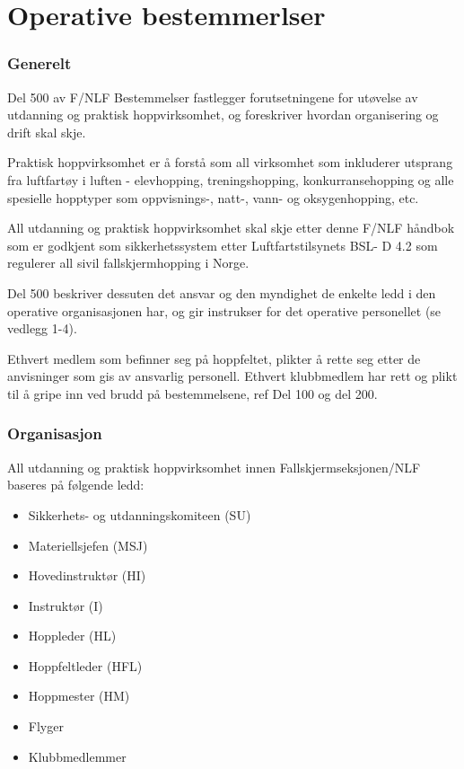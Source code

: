 \part{Operative bestemmerlser}
\setcounter{section}{500}

\section{Generelt}
Del 500 av F/NLF Bestemmelser fastlegger forutsetningene for utøvelse av utdanning og praktisk hoppvirksomhet, og foreskriver hvordan organisering og drift skal skje.

Praktisk hoppvirksomhet er å forstå som all virksomhet som inkluderer utsprang fra luftfartøy i luften - elevhopping, treningshopping, konkurransehopping og alle spesielle hopptyper som oppvisnings-, natt-, vann- og oksygenhopping, etc.

All utdanning og praktisk hoppvirksomhet skal skje etter denne F/NLF håndbok som er godkjent som sikkerhetssystem etter Luftfartstilsynets BSL- D 4.2 som regulerer all sivil fallskjermhopping i Norge.

Del 500 beskriver dessuten det ansvar og den myndighet de enkelte ledd i den operative organisasjonen har, og gir instrukser for det operative personellet (se vedlegg 1-4).

Ethvert medlem som befinner seg på hoppfeltet, plikter å rette seg etter de anvisninger som gis av ansvarlig personell. Ethvert klubbmedlem har rett og plikt til å gripe inn ved brudd på bestemmelsene, ref Del 100 og del 200.

\section{Organisasjon}
All utdanning og praktisk hoppvirksomhet innen Fallskjermseksjonen/NLF baseres på følgende ledd:
\begin{itemize}
	\item Sikkerhets- og utdanningskomiteen (SU)
	\item Materiellsjefen (MSJ)
	\item Hovedinstruktør (HI)
	\item Instruktør (I)
	\item Hoppleder (HL)
	\item Hoppfeltleder (HFL)
	\item Hoppmester (HM)
	\item Flyger
	\item Klubbmedlemmer
\end{itemize}

